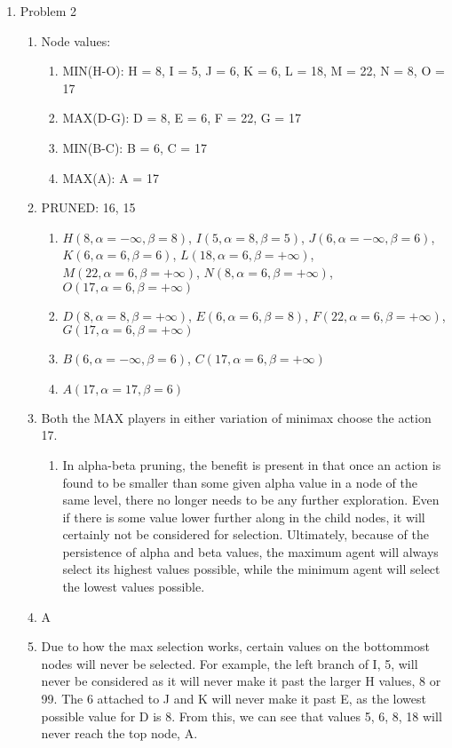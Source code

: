 \documentclass[11pt]{article}
\begin{document}
\begin{enumerate}
\item Problem 2
\begin{enumerate}
\item Node values:
\begin{enumerate}
\item MIN(H-O): H = 8, I = 5, J = 6, K = 6, L = 18, M = 22, N = 8, O = 17
\item MAX(D-G): D = 8, E = 6, F = 22, G = 17
\item MIN(B-C): B = 6, C = 17
\item MAX(A): A = 17
\end{enumerate}
\item PRUNED: 16, 15
\begin{enumerate}
\item $H(8, \alpha= -\infty,\beta = 8)$, $I(5, \alpha = 8 , \beta = 5)$, $J(6, \alpha= -\infty,\beta = 6)$, $K(6, \alpha = 6, \beta = 6)$, $L(18, \alpha = 6, \beta = +\infty)$, $M(22, \alpha = 6, \beta = +\infty)$, $N(8, \alpha = 6, \beta = +\infty)$, $O(17, \alpha = 6, \beta = +\infty)$
\item $D(8, \alpha = 8, \beta= + \infty)$, $E(6, \alpha = 6, \beta = 8)$, $F(22, \alpha = 6, \beta = +\infty)$, $G(17, \alpha = 6, \beta = +\infty)$
\item $B(6, \alpha = -\infty, \beta = 6)$, $C(17, \alpha = 6 , \beta = +\infty)$
\item $A(17, \alpha = 17, \beta = 6)$
\end{enumerate}
\item Both the MAX players in either variation of minimax choose the action 17.
\begin{enumerate}
\item In alpha-beta pruning, the benefit is present in that once an action is found to be smaller than some given alpha value in a node of the same level, there no longer needs to be any further exploration. Even if there is some value lower further along in the child nodes, it will certainly not be considered for selection. Ultimately, because of the persistence of alpha and beta values, the maximum agent will always select its highest values possible, while the minimum agent will select the lowest values possible.
\end{enumerate}
\item A
\item Due to how the max selection works, certain values on the bottommost nodes will never be selected. For example, the left branch of I, 5, will never be considered as it will never make it past the larger H values, 8 or 99. The 6 attached to J and K will never make it past E, as the lowest possible value for D is 8. From this, we can see that values 5, 6, 8, 18 will never reach the top node, A.

\end{enumerate}
\end{enumerate}
\end{document}
